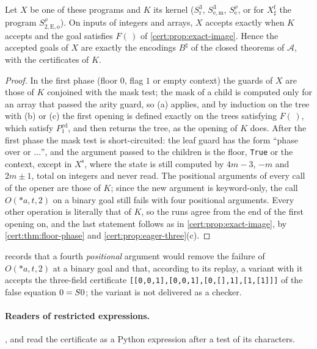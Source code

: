 \begin{proposition}\label{cert:prop:masks}
Let $X$ be one of these programs and $K$ its kernel ($S^{3}_{\mathrm r}$,
$S^{3}_{\mathrm{e,m}}$, $S^{\rho}_{\mathrm e}$, or for $X^{\mathrm f}_{\sharp}$ the
program $S^{\rho}_{2,\mathrm{E,o}}$). On inputs of integers and arrays, $X$
accepts exactly when $K$ accepts and the goal satisfies $F(\,)$ of
\cref{cert:prop:exact-image}. Hence the accepted goals of $X$ are exactly the encodings
$B^{\sharp}$ of the closed theorems of $\mathcal A$, with the certificates of $K$.
\end{proposition}
\begin{proof}
In the first phase (floor $0$, flag $1$ or empty context) the guards of $X$ are those of
$K$ conjoined with the mask test; the mask of a child is computed only for an array that
passed the arity guard, so (a) applies, and by induction on the tree with (b) or (c) the
first opening is defined exactly on the trees satisfying $F(\,)$, which satisfy
$P^{\mathrm{ed}}_{1}$, and then returns the tree, as the opening of $K$ does. After the
first phase the mask test is short-circuited: the leaf guard has the form ``phase over
or $\ldots$'', and the argument passed to the children is the floor, \texttt{True} or the
context, except in $X^{\mathrm s}$, where the state is still computed by $4m-3$, $-m$ and
$2m\pm 1$, total on integers and never read. The positional arguments of every call of the
opener are those of $K$; since the new argument is keyword-only, the call $O(\ast a,t,2)$
on a binary goal still fails with four positional arguments. Every other operation is
literally that of $K$, so the runs agree from the end of the first opening on, and the
last statement follows as in \cref{cert:prop:exact-image}, by \cref{cert:thm:floor-phase}
and \cref{cert:prop:eager-three}(c).
\end{proof}

 records that a fourth \emph{positional} argument would remove the
failure of $O(\ast a,t,2)$ at a binary goal and that, according to its replay, a variant
with it accepts the three-field certificate
\texttt{[[0,0,1],[0,0,1],[0,[],1],[1,[1]]]} of the false equation $0=S 0$; the variant
is not delivered as a checker.

\paragraph{Readers of restricted expressions.} ,
 and  read the certificate as a Python
expression after a test of its characters.

